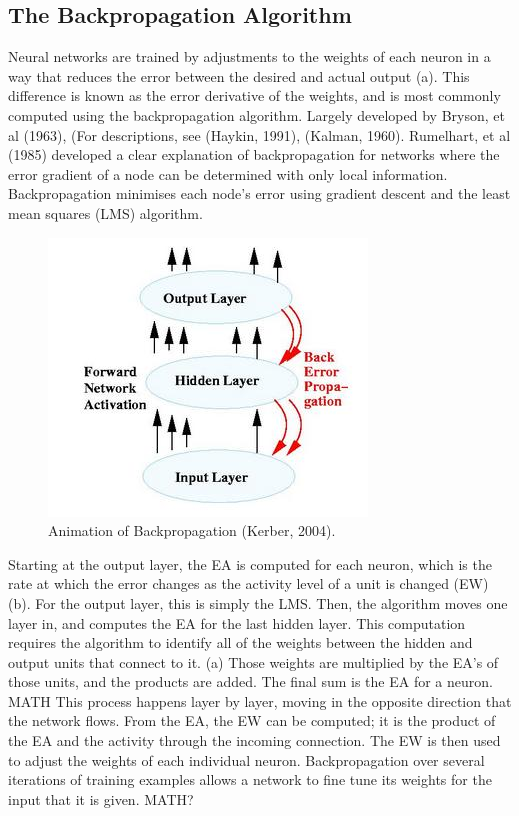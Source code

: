 \documentclass[12pt,twoside]{report}
\begin{document}
		\subsection{The Backpropagation Algorithm}
Neural networks are trained by adjustments to the weights of each neuron in a way that reduces the error between the desired and actual output (a). This difference is known as the error derivative of the weights, and is most commonly computed using the backpropagation algorithm. Largely developed by Bryson, et al  (1963), (For descriptions, see (Haykin, 1991), (Kalman, 1960). Rumelhart, et al (1985) developed a clear explanation of backpropagation for networks where the error gradient of a node can be determined with only local information. Backpropagation minimises each node’s error using gradient descent and the least mean squares (LMS) algorithm. 


\begin{figure}[tb]
\centering
\includegraphics[width = 0.5\hsize]{./figures/backpropagation}
\caption{Animation of Backpropagation (Kerber, 2004).}
\label{fig:backpropagation}
\end{figure}



	Starting at the output layer, the EA is computed for each neuron, which is the rate at which the error changes as the activity level of a unit is changed (EW) (b). For the output layer, this is simply the LMS. Then, the algorithm moves one layer in, and computes the EA for the last hidden layer. This computation requires the algorithm to identify all of the weights between the hidden and output units that connect to it. (a) Those weights are multiplied by the EA’s of those units, and the products are added. The final sum is the EA for a neuron. 
	MATH
This process happens layer by layer, moving in the opposite direction that the network flows. From the EA, the EW can be computed; it is the product of the EA and the activity through the incoming connection. The EW is then used to adjust the weights of each individual neuron. Backpropagation over several iterations of training examples allows a network to fine tune its weights for the input that it is given.
MATH?
\end{document}
